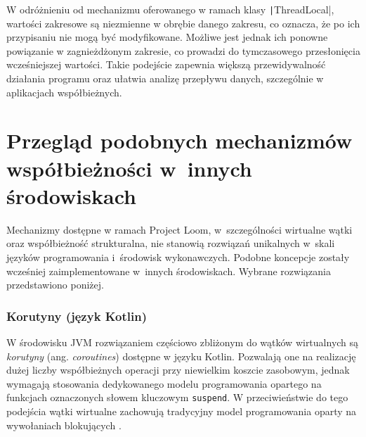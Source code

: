     


W odróżnieniu od mechanizmu oferowanego w ramach klasy \texttt|ThreadLocal|, wartości zakresowe są niezmienne w obrębie danego zakresu, co oznacza, że po ich przypisaniu nie mogą być modyfikowane. Możliwe jest jednak ich ponowne powiązanie w zagnieżdżonym zakresie, co prowadzi do tymczasowego przesłonięcia wcześniejszej wartości. Takie podejście zapewnia większą przewidywalność działania programu oraz ułatwia analizę przepływu danych, szczególnie w aplikacjach współbieżnych. \cite{java-scoped-value}

\section{Przegląd podobnych mechanizmów współbieżności w~innych środowiskach}

Mechanizmy dostępne w ramach Project Loom, w~szczególności wirtualne wątki oraz współbieżność strukturalna, nie stanowią rozwiązań unikalnych w~skali języków programowania i~środowisk wykonawczych. Podobne koncepcje zostały wcześniej zaimplementowane w~innych środowiskach. Wybrane rozwiązania przedstawiono poniżej.

\subsubsection{Korutyny (język Kotlin)}
W środowisku JVM rozwiązaniem częściowo zbliżonym do wątków wirtualnych są \emph{korutyny} (ang. \emph{coroutines}) dostępne w języku Kotlin. Pozwalają one na realizację dużej liczby współbieżnych operacji przy niewielkim koszcie zasobowym, jednak wymagają stosowania dedykowanego modelu programowania opartego na funkcjach oznaczonych słowem kluczowym \texttt{suspend}. W przeciwieństwie do tego podejścia wątki wirtualne zachowują tradycyjny model programowania oparty na wywołaniach blokujących \cite{kotlin-coroutines-docs}.

